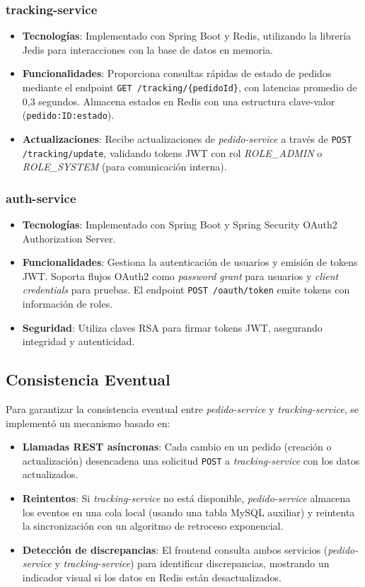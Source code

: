 \documentclass[a4paper,12pt]{article}
\begin{document}
\subsubsection{tracking-service}
\begin{itemize}
    \item \textbf{Tecnologías}: Implementado con Spring Boot y Redis, utilizando la librería Jedis para interacciones con la base de datos en memoria.
    \item \textbf{Funcionalidades}: Proporciona consultas rápidas de estado de pedidos mediante el endpoint \texttt{GET /tracking/\{pedidoId\}}, con latencias promedio de 0,3 segundos. Almacena estados en Redis con una estructura clave-valor (\texttt{pedido:ID:estado}).
    \item \textbf{Actualizaciones}: Recibe actualizaciones de \textit{pedido-service} a través de \texttt{POST /tracking/update}, validando tokens JWT con rol \textit{ROLE\_ADMIN} o \textit{ROLE\_SYSTEM} (para comunicación interna).
\end{itemize}

\subsubsection{auth-service}
\begin{itemize}
    \item \textbf{Tecnologías}: Implementado con Spring Boot y Spring Security OAuth2 Authorization Server.
    \item \textbf{Funcionalidades}: Gestiona la autenticación de usuarios y emisión de tokens JWT. Soporta flujos OAuth2 como \textit{password grant} para usuarios y \textit{client credentials} para pruebas. El endpoint \texttt{POST /oauth/token} emite tokens con información de roles.
    \item \textbf{Seguridad}: Utiliza claves RSA para firmar tokens JWT, asegurando integridad y autenticidad.
\end{itemize}

\subsection{Consistencia Eventual}
Para garantizar la consistencia eventual entre \textit{pedido-service} y \textit{tracking-service}, se implementó un mecanismo basado en:
\begin{itemize}
    \item \textbf{Llamadas REST asíncronas}: Cada cambio en un pedido (creación o actualización) desencadena una solicitud \texttt{POST} a \textit{tracking-service} con los datos actualizados.
    \item \textbf{Reintentos}: Si \textit{tracking-service} no está disponible, \textit{pedido-service} almacena los eventos en una cola local (usando una tabla MySQL auxiliar) y reintenta la sincronización con un algoritmo de retroceso exponencial.
    \item \textbf{Detección de discrepancias}: El frontend consulta ambos servicios (\textit{pedido-service} y \textit{tracking-service}) para identificar discrepancias, mostrando un indicador visual si los datos en Redis están desactualizados.
\end{itemize}
\end{document}
